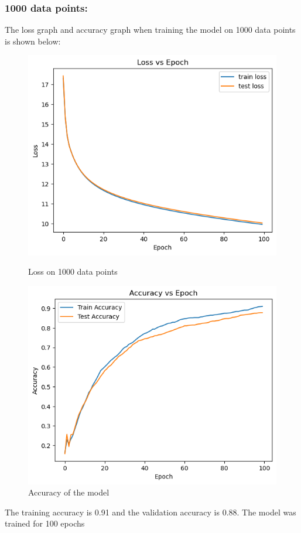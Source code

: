 \documentclass{article}
\begin{document}
\subsubsection*{1000 data points:}
The loss graph and accuracy graph when training the model on 1000 data points is shown below:
\begin{figure}[h!]
    \centering
    \begin{minipage}{0.45\textwidth}
        \centering
        \includegraphics[width=1\textwidth]{graphs/loss_1000.png} %
        \caption{Loss on 1000 data points}
    \end{minipage}\hfill
    \begin{minipage}{0.45\textwidth}
        \centering
        \includegraphics[width=1\textwidth]{graphs/accuracy_1000.png} %
        \caption{Accuracy of the model}
    \end{minipage}
\end{figure}
\newline The training accuracy is 0.91 and the validation accuracy is 0.88. The model was trained for 100 epochs
\end{document}
